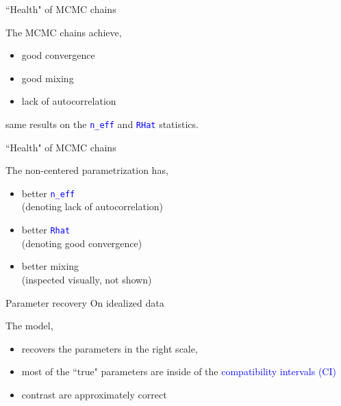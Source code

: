 %
%
\begin{lhframe}[rhgraphic={\texttt{[image: chains2.pdf]}}]
	{``Health" of MCMC chains}
	
	The MCMC chains achieve,
	\begin{itemize}
		\item good convergence
		\item good mixing
		\item lack of autocorrelation
	\end{itemize}
	
	same results on the \textcolor{blue}{ \texttt{n\_eff} } and \textcolor{blue}{ \texttt{RHat} } statistics.
\end{lhframe}
%
%
\begin{lhframe}[rhgraphic={\texttt{[image: chain\_stat.pdf]}}]
	{``Health" of MCMC chains}
	
	The non-centered parametrization has,
	\begin{itemize}
		\item better \textcolor{blue}{ \texttt{n\_eff} } \\
		(denoting lack of autocorrelation)
		\item better \textcolor{blue}{ \texttt{Rhat} } \\
		(denoting good convergence)
		\item better mixing \\
		(inspected visually, not shown)
	\end{itemize}
\end{lhframe}
%
%
\begin{lhframe}[rhgraphic={\texttt{[image: recovery.pdf]}}]
	{Parameter recovery}
	{On idealized data}
	
	The model,
	\begin{itemize}
		\item recovers the parameters in the right scale,
		\item most of the ``true" parameters are inside of the \textcolor{blue}{compatibility intervals (CI)}
		\item contrast are approximately correct
	\end{itemize}
\end{lhframe}
%
%

